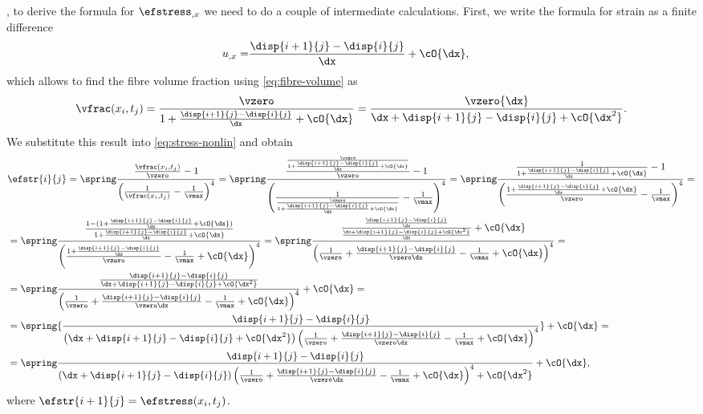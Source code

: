 \documentclass[twoside,a4paper,12pt]{article}
\begin{document}
, to derive the
formula for $ \efstress_{,x}$ we need to do a couple of intermediate
calculations.  First, we write the formula for strain as a finite
difference
%
\begin{align}
  u_{,x} =& \frac{\disp{i+1}{j} - \disp{i}{j}}{\dx} + \cO{\dx},
\end{align}
%
which allows to find the fibre volume fraction using
\eqref{eq:fibre-volume} as
%
\begin{align}
  \vfrac(x_i,t_j) = \frac{\vzero}{1+\frac{\disp{i+1}{j} - \disp{i}{j}}{\dx} + \cO{\dx}}
  = \frac{\vzero{\dx}}{{\dx + \disp{i+1}{j} - \disp{i}{j} + \cO{\dx^2}}}
  \label{eq:vfrac-findiff}.
\end{align}
%
We substitute this result into \eqref{eq:stress-nonlin} and obtain
%
\begin{align}
  &\efstr{i}{j} = \spring
  \frac{\frac{\vfrac(x_i,t_j)}{\vzero} -1}{\left(\frac{1}{\vfrac(x_i,t_j)} -\frac{1}{\vmax}\right)^4} = \spring
  \frac{\frac{\frac{\vzero}{1+\frac{\disp{i+1}{j} - \disp{i}{j}}{\dx} + \cO{\dx}}}{\vzero} -1}{\left(\frac{1}{\frac{\vzero}{1+\frac{\disp{i+1}{j} - \disp{i}{j}}{\dx} + \cO{\dx}}} -\frac{1}{\vmax}\right)^4} = \spring
  \frac{{\frac{1}{1+\frac{\disp{i+1}{j} - \disp{i}{j}}{\dx} + \cO{\dx}}} -1}{\left({\frac{1+\frac{\disp{i+1}{j} - \disp{i}{j}}{\dx} + \cO{\dx}}{\vzero}} -\frac{1}{\vmax}\right)^4} = \nonumber \\
  &= \spring\frac{\frac{1 -(1+\frac{\disp{i+1}{j} - \disp{i}{j}}{\dx} + \cO{\dx})}{1+\frac{\disp{i+1}{j} - \disp{i}{j}}{\dx} + \cO{\dx}}}{\left({\frac{1+\frac{\disp{i+1}{j} - \disp{i}{j}}{\dx}}{\vzero}} -\frac{1}{\vmax}  + \cO{\dx}\right)^4}
    = \spring\frac{\frac{\frac{\disp{i+1}{j} - \disp{i}{j}}{\dx}}{\frac{\dx + \disp{i+1}{j} - \disp{i}{j} + \cO{\dx^2}}{\dx}} + \cO{\dx}}{\left(\frac{1}{\vzero} + \frac{\disp{i+1}{j} - \disp{i}{j}}{\vzero\dx} -\frac{1}{\vmax}  + \cO{\dx}\right)^4}= \nonumber \\
  &= \spring \frac{\frac{\disp{i+1}{j} - \disp{i}{j}}{\dx + \disp{i+1}{j} - \disp{i}{j} + \cO{\dx^2}}}%
    {\left(\frac{1}{\vzero} + \frac{\disp{i+1}{j} - \disp{i}{j}}{\vzero\dx} -\frac{1}{\vmax}  + \cO{\dx}\right)^4} + \cO{\dx} = \nonumber \\
  &= \spring {\frac{\disp{i+1}{j} - \disp{i}{j}}{\left(\dx + \disp{i+1}{j} - \disp{i}{j} + \cO{\dx^2}\right){\left(\frac{1}{\vzero} + \frac{\disp{i+1}{j} - \disp{i}{j}}{\vzero\dx} -\frac{1}{\vmax}  + \cO{\dx}\right)^4}}}%
    + \cO{\dx} =  \nonumber \\
  &= \spring \frac{\disp{i+1}{j} - \disp{i}{j}}{\left(\dx + \disp{i+1}{j} - \disp{i}{j}\right){\left(\frac{1}{\vzero} + \frac{\disp{i+1}{j} - \disp{i}{j}}{\vzero\dx} -\frac{1}{\vmax}  + \cO{\dx}\right)^4} + \cO{\dx^2}}
    + \cO{\dx}
  , \label{eq:stress-nonlin-findif}
\end{align}
where $\efstr{i+1}{j} = \efstress(x_i,t_j)$.
\end{document}
